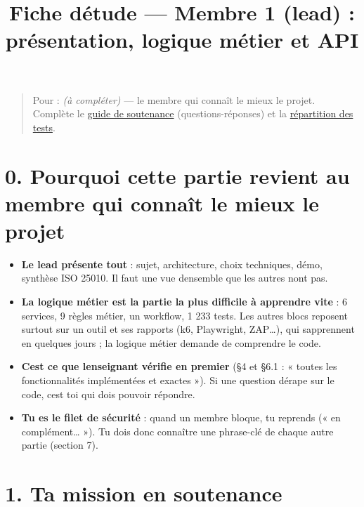 \documentclass[
  11pt,
]{article}
\title{Fiche d\textquotesingle étude --- Membre 1 (lead) : présentation,
logique métier et API}
\author{}
\date{}
\providecommand{\tightlist}{%
  \setlength{\itemsep}{0pt}\setlength{\parskip}{0pt}}
\let\tdmorigine\tableofcontents
\renewcommand{\tableofcontents}{\tdmorigine\newpage}
\begin{document}
\maketitle

\renewcommand*\contentsname{Table des matières}
{
\hypersetup{linkcolor=}
\setcounter{tocdepth}{3}
\tableofcontents
}
\begin{quote}
Pour : \emph{(à compléter)} --- le membre qui connaît le mieux le
projet. Complète le \href{SOUTENANCE.pdf}{guide de soutenance}
(questions-réponses) et la \href{REPARTITION_TESTS.pdf}{répartition des
tests}.
\end{quote}

\section{0. Pourquoi cette partie revient au membre qui connaît le mieux
le
projet}\label{0-pourquoi-cette-partie-revient-au-membre-qui-connauxeet-le-mieux-le-projet}

\begin{itemize}
\tightlist
\item
  \textbf{Le lead présente tout} : sujet, architecture, choix
  techniques, démo, synthèse ISO 25010. Il faut une vue
  d\textquotesingle ensemble que les autres n\textquotesingle ont pas.
\item
  \textbf{La logique métier est la partie la plus difficile à apprendre
  vite} : 6 services, 9 règles métier, un workflow, 1 233 tests. Les
  autres blocs reposent surtout sur un outil et ses rapports (k6,
  Playwright, ZAP\ldots), qui s\textquotesingle apprennent en quelques
  jours ; la logique métier demande de comprendre le code.
\item
  \textbf{C\textquotesingle est ce que l\textquotesingle enseignant
  vérifie en premier} (§4 et §6.1 : « toutes les fonctionnalités
  implémentées et exactes »). Si une question dérape sur le code,
  c\textquotesingle est toi qui dois pouvoir répondre.
\item
  \textbf{Tu es le filet de sécurité} : quand un membre bloque, tu
  reprends (« en complément\ldots{} »). Tu dois donc connaître une
  phrase-clé de chaque autre partie (section 7).
\end{itemize}

\section{1. Ta mission en soutenance}\label{1-ta-mission-en-soutenance}
\end{document}
